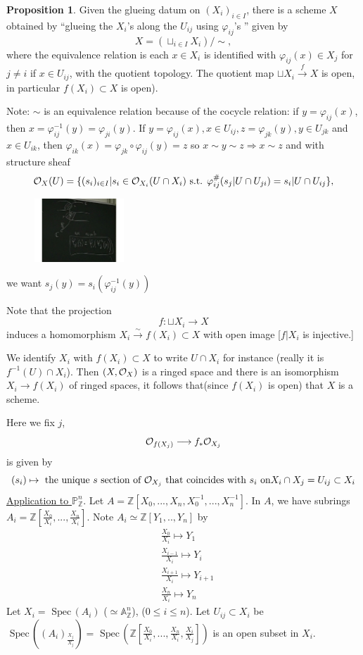 \documentclass[11pt]{article}
\theoremstyle{definition}
\newtheorem{prop}[thm]{Proposition}
\newcommand{\spec}{\text{ Spec}\,}
\newcommand{\affn}{\mathbb A}
\newcommand{\proj}{\mathbb P}
\newcommand{\intg}{\mathbb Z}
\newcommand{\calo}{{\cal O}}
\newcommand{\Lrta}{\Longrightarrow}
\newcommand{\lrta}{\longrightarrow}
\begin{document}
\begin{prop}
Given the glueing datum on $(X_i)_{i\in I}$, there is a scheme $X$ obtained by ``glueing the $X_i$'s along the $U_{ij}$ using $\varphi_{ij}$'s '' given by 
$$
X=\left(\sqcup_{i\in I}X_i\right)/\sim,
$$
where the equivalence relation is each $x\in X_i$ is identified with $\varphi_{ij}(x)\in X_{j}$ for $j\neq i$ if $x\in U_{ij}$, with the quotient topology. The quotient map $\sqcup X_i\overset{f}{\lrta} X$ is open, in particular $f(X_i)\subset X$ is open).

Note: $\sim$ is an equivalence relation because of the cocycle relation: if $y=\varphi_{ij}(x)$, then $x=\varphi_{ij}^{-1}(y)=\varphi_{ji}(y)$. If $y=\varphi_{ij}(x),x\in U_{ij},z=\varphi_{jk}(y), y\in U_{jk}$ and $x\in U_{ik}$, then $\varphi_{ik}(x)=\varphi_{jk}\circ \varphi_{ij}(y)=z$ so $x\sim y\sim z\Lrta x\sim z$ and with structure sheaf
$$
\calo_X(U)=\{(s_i)_{i\in I}|s_i\in \calo_{X_i}(U\cap X_i) \text{ s.t. } \varphi_{ij}^{\#}(s_{j}|U\cap U_{ji})=s_i|U\cap U_{ij}\},
$$
\begin{figure}[h]
\includegraphics[width=0.3\textwidth]{pic2Aprl27.pdf}
\end{figure}
we want
$s_j(y)=s_i(\varphi_{ij}^{-1}(y))$
\end{prop}
Note that the projection 
$$
f:\sqcup X_i\lrta X
$$ induces a homomorphism
$X_i\overset{\sim}{\lrta} f(X_i)\subset X$ with open image [$f|X_i$ is injective.]

We identify $X_i$ with $f(X_i)\subset X$ to write $U\cap X_i$ for instance (really it is $f^{-1}(U)\cap X_i$). Then $(X,\calo_X)$ is a ringed space  and there is an isomorphism 
$X_i\lrta f(X_i)$ of ringed spaces, it follows that(since $f(X_i)$ is open) that $X$ is a scheme.

Here we fix $j$,
$$
\calo_{f(X_j)}\lrta f_*\calo_{X_j}
$$
is given by 
$$
(s_i)\mapsto \text{ the unique $s$ section of $\calo_{X_j}$ that coincides with $s_i$ on} X_i\cap X_j=U_{ij}\subset X_i
$$
\underline{Application to } $\proj^n_\intg$. Let $A=\intg[X_0,...,X_n, X_0^{-1},...,X_n^{-1}]$. In $A$, we have subrings $A_i=\intg[\frac{X_0}{X_i},...,\frac{X_n}{X_i}]$. Note $A_i\simeq \intg[Y_1,..,Y_n]$ by 
$$
\begin{aligned}
&\frac{X_0}{X_i}\mapsto Y_1\\
&\frac{X_{i-1}}{X_i}\mapsto Y_{i}\\
&\frac{X_{i+1}}{X_i}\mapsto Y_{i+1}\\
&\frac{X_n}{X_i}\mapsto Y_n
\end{aligned}
$$
Let $X_i=\spec(A_i)$ ($\simeq \affn^n_\intg$), ($0\leq i \leq n$). Let $U_{ij}\subset X_i$ be $\spec\left((A_i)_{\frac{X_j}{X_j}}\right)=\spec (\intg[\frac{X_0}{X_i},...,\frac{X_n}{X_i},\frac{X_i}{X_j}])$ is an open subset in $X_i$.
\end{document}
